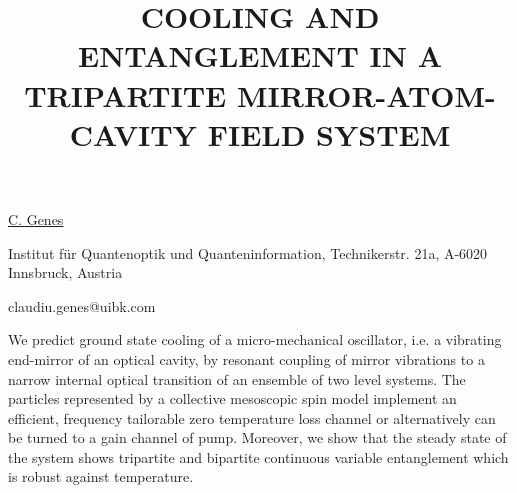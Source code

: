 \title{COOLING AND ENTANGLEMENT IN A TRIPARTITE MIRROR-ATOM-CAVITY FIELD SYSTEM}

\underline{C. Genes} 

{\normalsize{\vspace{-4mm}
Institut f\"ur Quantenoptik und Quanteninformation, Technikerstr.
21a, A-6020 \mbox{Innsbruck}, Austria

\email claudiu.genes@uibk.com}}

We predict ground state cooling of a micro-mechanical oscillator, i.e. a
vibrating end-mirror of an optical cavity, by resonant coupling of mirror
vibrations to a narrow internal optical transition of an ensemble of two level
systems. The particles represented by a collective mesoscopic spin model
implement an efficient, frequency tailorable zero temperature loss channel
or alternatively can be turned to a gain channel of pump. Moreover, we show that
the steady state of the system shows tripartite and bipartite continuous
variable entanglement which is robust against temperature.

\vspace{\baselineskip}